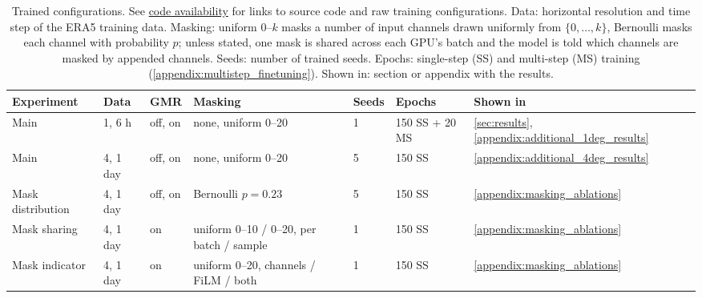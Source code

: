 \begin{table}[H]
  \caption{Trained configurations. See \hyperref[fn:code_availability]{code availability} for links to source code and raw training configurations. Data: horizontal resolution and time step of the ERA5 training data. Masking: uniform 0--$k$ masks a number of input channels drawn uniformly from $\{0, \ldots, k\}$, Bernoulli masks each channel with probability $p$; unless stated, one mask is shared across each GPU's batch and the model is told which channels are masked by appended channels. Seeds: number of trained seeds. Epochs: single-step (SS) and multi-step (MS) training (\autoref{appendix:multistep_finetuning}). Shown in: section or appendix with the results.}
  \label{table:configurations}
  \centering
  \small
  \setlength{\tabcolsep}{4pt}
  \begin{tabular}{lllp{3.3cm}lll}
    \toprule
    Experiment & Data & GMR & Masking & Seeds & Epochs & Shown in \\
    \midrule
    Main & 1\textdegree{}, 6 h & off, on & none, uniform 0--20 & 1 & 150 SS + 20 MS & \ref{sec:results}, \ref{appendix:additional_1deg_results} \\
    Main & 4\textdegree{}, 1 day & off, on & none, uniform 0--20 & 5 & 150 SS & \ref{appendix:additional_4deg_results} \\
    Mask distribution & 4\textdegree{}, 1 day & off, on & Bernoulli $p = 0.23$ & 5 & 150 SS & \ref{appendix:masking_ablations} \\
    Mask sharing & 4\textdegree{}, 1 day & on & uniform 0--10 / 0--20, per batch / sample & 1 & 150 SS & \ref{appendix:masking_ablations} \\
    Mask indicator & 4\textdegree{}, 1 day & on & uniform 0--20, channels / FiLM / both & 1 & 150 SS & \ref{appendix:masking_ablations} \\
    \bottomrule
  \end{tabular}
\end{table}
